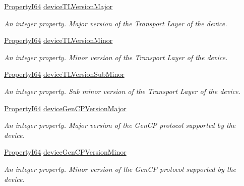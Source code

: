 \begin{DoxyCompactItemize}
\hyperlink{group___common_interface_ga81749b2696755513663492664a18a893}{Property\+I64} \hyperlink{classmv_i_m_p_a_c_t_1_1acquire_1_1_gen_i_cam_1_1_device_control_accff8360a9efcd221734d6ef80aa648f}{device\+T\+L\+Version\+Major}
\begin{DoxyCompactList}\small\item\em An integer property. Major version of the Transport Layer of the device. \end{DoxyCompactList}\item 
\hyperlink{group___common_interface_ga81749b2696755513663492664a18a893}{Property\+I64} \hyperlink{classmv_i_m_p_a_c_t_1_1acquire_1_1_gen_i_cam_1_1_device_control_a73106e374d696420cc8818f0587765b6}{device\+T\+L\+Version\+Minor}
\begin{DoxyCompactList}\small\item\em An integer property. Minor version of the Transport Layer of the device. \end{DoxyCompactList}\item 
\hyperlink{group___common_interface_ga81749b2696755513663492664a18a893}{Property\+I64} \hyperlink{classmv_i_m_p_a_c_t_1_1acquire_1_1_gen_i_cam_1_1_device_control_a24e14cdc73f997aab20a1220a0352938}{device\+T\+L\+Version\+Sub\+Minor}
\begin{DoxyCompactList}\small\item\em An integer property. Sub minor version of the Transport Layer of the device. \end{DoxyCompactList}\item 
\hyperlink{group___common_interface_ga81749b2696755513663492664a18a893}{Property\+I64} \hyperlink{classmv_i_m_p_a_c_t_1_1acquire_1_1_gen_i_cam_1_1_device_control_a1694f3b88bad5801fd2e020a025f22b6}{device\+Gen\+C\+P\+Version\+Major}
\begin{DoxyCompactList}\small\item\em An integer property. Major version of the Gen\+C\+P protocol supported by the device. \end{DoxyCompactList}\item 
\hyperlink{group___common_interface_ga81749b2696755513663492664a18a893}{Property\+I64} \hyperlink{classmv_i_m_p_a_c_t_1_1acquire_1_1_gen_i_cam_1_1_device_control_a40f7fb42f5891ef2e6dd5153c973a420}{device\+Gen\+C\+P\+Version\+Minor}
\begin{DoxyCompactList}\small\item\em An integer property. Minor version of the Gen\+C\+P protocol supported by the device. \end{DoxyCompactList}\item 

\end{DoxyCompactItemize}
